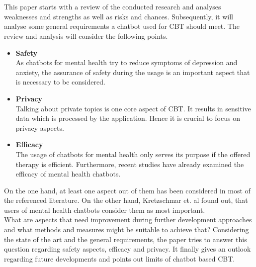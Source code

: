 \documentclass[sigconf, nonacm]{acmart}
\begin{document}
\\\\
This paper starts with a review of the conducted research and analyses weaknesses and strengths as well as risks and chances. 
Subsequently, it will analyse some general requirements a chatbot used for CBT should meet.
The review and analysis will consider the following points. 
\\
\begin{itemize}
  \item{\textbf{Safety}}\\
  As chatbots for mental health try to reduce symptoms of depression and anxiety, the assurance of safety during the usage is an important aspect that is necessary to be considered.
  \\
  \item{\textbf{Privacy}}\\
  Talking about private topics is one core aspect of CBT. It results in sensitive data which is processed by the application. Hence it is crucial to focus on privacy aspects.
  \\
  \item{\textbf{Efficacy}}\\
  The usage of chatbots for mental health only serves its purpose if the offered therapy is efficient. Furthermore, recent studies have already examined the efficacy of mental health chatbots.\cite{Fitzpatrick2017,Inkster}
  \\
\end{itemize}
On the one hand, at least one aspect out of them has been considered in most of the referenced literature. On the other hand, Kretzschmar et. al \cite{Kretzschmar2019} found out, that users of mental health chatbots consider 
them as most important.
\\
What are aspects that need improvement during further development approaches and what methods and measures might be suitable to achieve that? 
Considering the state of the art and the general requirements, the paper tries to answer this question regarding safety aspects, efficacy and privacy.
It finally gives an outlook regarding future developments and points out limits of chatbot based CBT.
\end{document}
